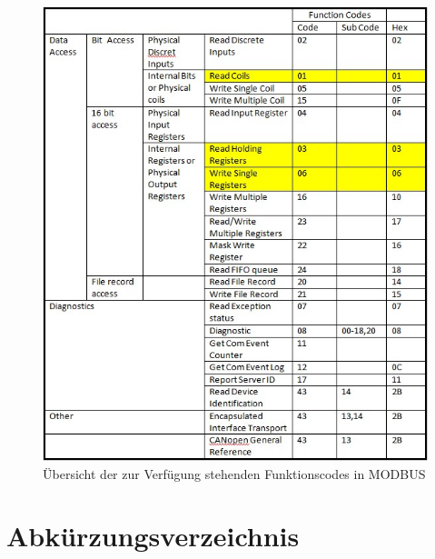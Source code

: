 \begin{figure}[hbtp]
\centering
\includegraphics[scale=0.65]{modbus/fcodetab}
\caption{Übersicht der zur Verfügung stehenden Funktionscodes in MODBUS}
\label{fig:fcodetab}
\end{figure} 
\chapter{Abkürzungsverzeichnis}

